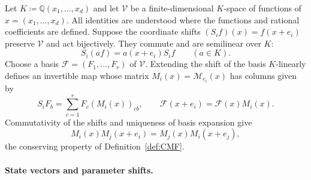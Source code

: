 \documentclass[oneside,english,11pt]{amsart}
\begin{document}
Let $K\coloneqq\mathbb Q(x_1,\ldots,x_d)$ and let $\mathcal V$
be a finite-dimensional $K$-space of functions of $x=(x_1,\ldots,x_d)$.
All identities are understood where the functions and rational
coefficients are defined. Suppose the coordinate shifts
$(S_if)(x)=f(x+e_i)$ preserve $\mathcal V$ and act bijectively.
They commute and are semilinear over $K$:
\[
 S_i(af)=a(x+e_i)S_if\qquad(a\in K).
\]
Choose a basis $\mathcal F=(F_1,\ldots,F_r)$ of $\mathcal V$.
Extending the shift of the basis $K$-linearly defines an invertible
map whose matrix $M_i(x)=\mathcal M_{e_i}(x)$ has columns given by
\[
 S_iF_b=\sum_{c=1}^r F_c(M_i(x))_{cb},\qquad
 \mathcal F(x+e_i)=\mathcal F(x)M_i(x).
\]
Commutativity of the shifts and uniqueness of basis expansion give
\[
 M_i(x)M_j(x+e_i)=M_j(x)M_i(x+e_j),
\]
the conserving property of Definition~\ref{def:CMF}.%

%
%




\paragraph{State vectors and parameter shifts.}
\end{document}
